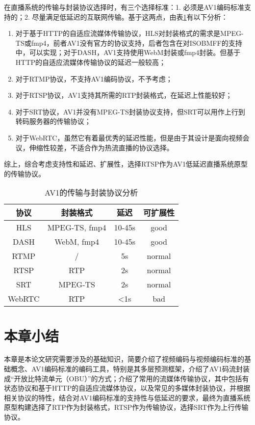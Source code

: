 在直播系统的传输与封装协议选择时，有三个选择标准：1. 必须是AV1编码标准支持的；2. 尽量满足低延迟的互联网传输。基于这两点，由表\ref{tab:protocol}有以下分析：

\begin{enumerate} [label=\arabic*)]
  \item 对于基于HTTP的自适应流媒体传输协议，HLS对封装格式的需求是MPEG-TS或fmp4，前者AV1没有官方的协议支持，后者包含在对ISOBMFF的支持中，可以实现；对于DASH，AV1支持使用WebM封装或fmp4封装。但基于HTTP的自适应流媒体传输协议的延迟一般较高；
  \item 对于RTMP协议，不支持AV1编码协议，不予考虑；
  \item 对于RTSP协议，AV1支持其所需的RTP封装格式，在延迟上性能较好；
  \item 对于SRT协议，AV1并没有MPEG-TS封装协议支持，但SRT可以用作上行到转码服务器的传输协议；
  \item 对于WebRTC，虽然它有着最优秀的延迟性能，但是由于其设计是面向视频会议，伸缩性较差，不适合作为热流直播的协议选择。
\end{enumerate}

综上，综合考虑支持性和延迟、扩展性，选择RTSP作为AV1低延迟直播系统原型的传输协议。

\begin{table}[!hpt]
  \caption{AV1的传输与封装协议分析}
  \label{tab:protocol}
  \centering
  \begin{tabular}{cccc} \toprule
    协议     & 封装格式       & 延迟     & 可扩展性\\ \midrule
    HLS     & MPEG-TS, fmp4 & 10-45s  & good  \\
    DASH    & WebM, fmp4    & 10-45s  & good  \\
    RTMP    & /             & 5s      & normal \\
    RTSP    & RTP           & 2s      & normal \\
    SRT     & MPEG-TS       & 2s      & normal \\
    WebRTC  & RTP           & <1s     & bad    \\ \bottomrule
  \end{tabular}
\end{table}




\section{本章小结}

本章是本论文研究需要涉及的基础知识，简要介绍了视频编码与视频编码标准的基础概念、AV1编码标准的编码工具，特别是其多层预测框架，介绍了AV1码流封装成“开放比特流单元（OBU）”的方式；介绍了常用的流媒体传输协议，其中包括有状态协议和基于HTTP的自适应流媒体协议，以及常见的多媒体封装协议，并根据相关协议的特性，结合对AV1编码标准的支持性与低延迟的要求，最终为直播系统原型构建选择了RTP作为封装格式，RTSP作为传输协议，选择SRT作为上行传输协议。